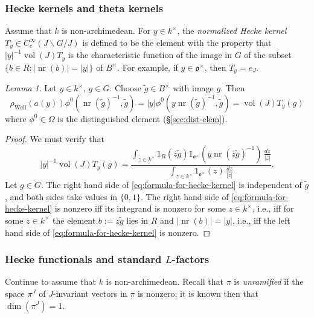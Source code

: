 \documentclass[reqno,10pt]{amsart}
\theoremstyle{plain} %
\theoremstyle{definition}
\theoremstyle{plain} %
\theoremstyle{remark}
\theoremstyle{itplain} %
\newtheorem*{lemma*}{Lemma}
\theoremstyle{remark} %
\numberwithin{equation}{section}
\DeclareMathOperator{\Weil}{Weil}
\DeclareMathOperator{\vol}{vol}
\DeclareMathOperator{\nr}{nr}
\begin{document}
\subsubsection{Hecke kernels and theta kernels\label{sec:hecke-kernels-local}}
\label{sec-2-4-1}
Assume that $k$ is non-archimedean.
For $y \in k^\times$, the \emph{normalized Hecke kernel} $T_y \in C_c^\infty(J \backslash G / J)$ is defined to be the element with the property that $|y|^{-1} \vol(J) T_y$ is the characteristic function of the image in $G$ of the subset $\{b \in R : |\nr(b)| = |y| \}$ of $B^\times$.
For example, if $y \in \mathfrak{o}^\times$, then $T_y = e_J$.
\begin{lemma*}\label{lem:relation-distinguished-elt-hecke-kernel}
  Let $y \in k^\times$, $g \in G$.  Choose $\tilde{g} \in B^\times$ with image $g$.  Then
  \[
    \rho_{\Weil}(a(y)) \phi^0(\nr(\tilde{g})^{-1}, \tilde{g}) = |y| \phi^0(y \nr(\tilde{g})^{-1}, \tilde{g}) = \vol(J) T_y(g)
  \]
  where $\phi^0 \in \Omega$ is the distinguished element (\S\ref{sec:dist-elem}).
\end{lemma*}
\begin{proof}
  We must verify that
  \begin{equation}\label{eq:formula-for-hecke-kernel}
    |y|^{-1} \vol(J) T_y(g) =
    \frac{
      \int_{z \in k^\times}
      1_R(z \tilde{g}) 1_{\mathfrak{o}^\times}(y \nr(z \tilde{g})^{-1})
      \, \frac{d z}{|z|}
    }
    {
      \int_{z \in k^\times}
      1_{\mathfrak{o}^\times}(z)
      \, \frac{d z}{|z|}
    }.
  \end{equation}
  Let $g \in G$.  The right hand side of \eqref{eq:formula-for-hecke-kernel} is independent of $\tilde{g}$, and both sides take values in $\{0,1\}$.
  The right hand side of \eqref{eq:formula-for-hecke-kernel} is nonzero iff its integrand is nonzero for some $z \in k^\times$, i.e., iff for some $z \in k^\times$ the element $b := z \tilde{g}$ lies in $R$ and $|\nr(b)| = |y|$, i.e., iff the left hand side of \eqref{eq:formula-for-hecke-kernel} is nonzero.

  
  
\end{proof}

\subsubsection{Hecke functionals and standard $L$-factors}
\label{sec-2-4-2}
Continue to assume that $k$ is non-archimedean.  Recall that $\pi$ is \emph{unramified} if the space $\pi^{J}$ of $J$-invariant vectors in $\pi$ is nonzero; it is known then that $\dim(\pi^J) = 1$.
\end{document}
